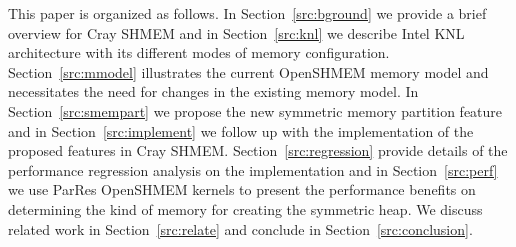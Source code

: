 This paper is organized as follows.
In Section~\ref{src:bground} we provide a brief overview for Cray SHMEM
and in Section~\ref{src:knl} we describe Intel KNL architecture with its
different modes of memory configuration. Section~\ref{src:mmodel}
illustrates the current OpenSHMEM memory model and necessitates the need
for changes in the existing memory model. In Section~\ref{src:smempart}
we propose the new symmetric memory partition feature and in
Section~\ref{src:implement} we follow up with
the implementation of the proposed features in Cray SHMEM.
Section~\ref{src:regression} provide details of the performance
regression analysis on the implementation and in
Section~\ref{src:perf}
we use ParRes OpenSHMEM kernels to present the performance benefits on
determining the kind of memory for creating the symmetric heap. We
discuss related work in Section~\ref{src:relate} and conclude in
Section~\ref{src:conclusion}.